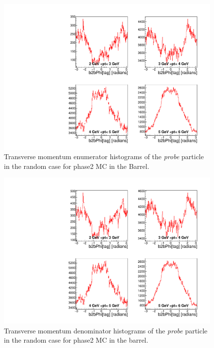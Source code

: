 \documentclass[a4paper,11pt,twosided,final,german,openbib,pdftex,listof=totoc,bibliography=totoc]{scrbook}
\begin{document}
\begin{appendix}
\begin{figure}[!htbp]
	\centering
	\includegraphics[width=\textwidth]{Plots/master/xPtMPhiRandomBarrelE_MC}
	\caption[Transverse Momentum $\phi$ Random Barrel Enumerator Histogram Phase2 MC]{Transverse momentum enumerator histograms of the \textit{probe} particle in the random case for phase2 MC in the Barrel.}
	\label{plt:PtMPhiRandomBarrelE_MC}
\end{figure}

\begin{figure}[!htbp]
	\centering
	\includegraphics[width=\textwidth]{Plots/master/xPtMPhiRandomBarrelD_MC}
	\caption[Transverse Momentum $\phi$ Random Barrel Denominator Histogram Phase2 MC]{Transverse momentum denominator histograms of the \textit{probe} particle in the random case for phase2 MC in the barrel.}
	\label{plt:PtMPhiRandomBarrelD_MC}
\end{figure}



\end{appendix}
\end{document}

